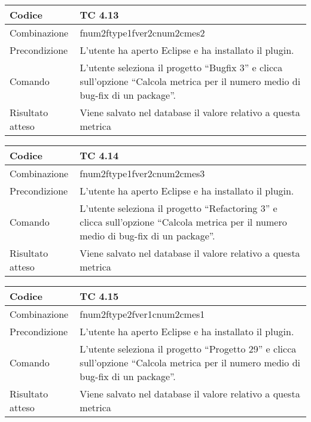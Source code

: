 \begin{table}[ht]
\begin{tabular}{|p{3cm}|p{9cm}|}
\hline
\cellcolor{lightgray}Codice				& TC 4.13								\\
\hline
\cellcolor{lightgray}Combinazione		& fnum2ftype1fver2cnum2cmes2									\\
\hline
\cellcolor{lightgray}Precondizione		& L'utente ha aperto Eclipse e ha installato il plugin.					\\
\hline
\cellcolor{lightgray}Comando			& L'utente seleziona il progetto ``Bugfix 3''  e clicca sull'opzione ``Calcola metrica per il numero medio di bug-fix di un package''.	\\
\hline
\cellcolor{lightgray}Risultato atteso	& Viene salvato nel database il valore relativo a questa metrica	\\
\hline
\end{tabular}
\end{table}

\begin{table}[ht]
\begin{tabular}{|p{3cm}|p{9cm}|}
\hline
\cellcolor{lightgray}Codice				& TC 4.14								\\
\hline
\cellcolor{lightgray}Combinazione		& fnum2ftype1fver2cnum2cmes3								\\
\hline
\cellcolor{lightgray}Precondizione		& L'utente ha aperto Eclipse e ha installato il plugin.			\\
\hline
\cellcolor{lightgray}Comando			& L'utente seleziona il progetto ``Refactoring 3''  e clicca sull'opzione ``Calcola metrica per il numero medio di bug-fix di un package''.	\\
\hline
\cellcolor{lightgray}Risultato atteso	& Viene salvato nel database il valore relativo a questa metrica	\\
\hline
\end{tabular}
\end{table}

\begin{table}[ht]
\begin{tabular}{|p{3cm}|p{9cm}|}
\hline
\cellcolor{lightgray}Codice				& TC 4.15								\\
\hline
\cellcolor{lightgray}Combinazione		& fnum2ftype2fver1cnum2cmes1 									\\
\hline
\cellcolor{lightgray}Precondizione		& L'utente ha aperto Eclipse e ha installato il plugin.			\\
\hline
\cellcolor{lightgray}Comando			& L'utente seleziona il progetto ``Progetto 29''  e clicca sull'opzione ``Calcola metrica per il numero medio di bug-fix di un package''.	\\
\hline
\cellcolor{lightgray}Risultato atteso	& Viene salvato nel database il valore relativo a questa metrica	\\
\hline
\end{tabular}
\end{table}

